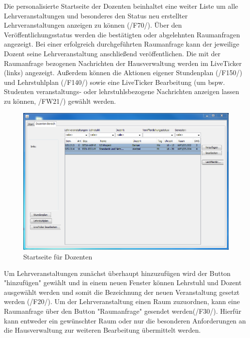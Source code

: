 Die personalisierte Startseite der Dozenten beinhaltet eine weiter Liste um alle Lehrveranstaltungen und besonderes den Status neu erstellter Lehrveranstaltungen anzeigen zu können (/F70/). Über den Veröffentlichungsstatus werden die bestätigten oder abgelehnten Raumanfragen angezeigt. Bei einer erfolgreich durchgeführten Raumanfrage kann der jeweilige Dozent seine Lehrveranstaltung anschließend veröffentlichen. Die mit der Raumanfrage bezogenen Nachrichten der Hausverwaltung werden im LiveTicker (links) angezeigt.
Außerdem können die Aktionen eigener Stundenplan (/F150/) und Lehrstuhlplan (/F140/) sowie eine LiveTicker Bearbeitung (um bspw. Studenten veranstaltungs- oder lehrstuhlsbezogene Nachrichten anzeigen lassen zu können, /FW21/) gewählt werden.
\begin{figure}[H]
\begin{center}
\includegraphics[width=170mm]{images/section_7/DozentenHauptseite.PNG}
\caption{Startseite für Dozenten}
\label{img:StartDoz}
\end{center}
\end{figure}

Um Lehrveranstaltungen zunächst überhaupt hinzuzufügen wird der Button "hinzufügen" gewählt und in einem neuen Fenster können Lehrstuhl und Dozent ausgewählt werden und somit die Bezeichnung der neuen Veranstaltung gesetzt werden (/F20/). Um der Lehrveranstaltung einen Raum zuzuordnen, kann eine Raumanfrage über den Button "Raumanfrage" gesendet werden(/F30/). Hierfür kann entweder ein gewünschter Raum oder nur die besonderen Anforderungen an die Hausverwaltung zur weiteren Bearbeitung übermittelt werden.

